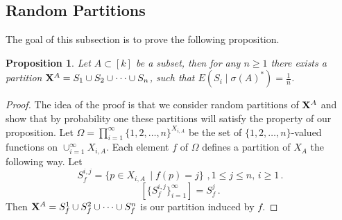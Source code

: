 \documentclass [11pt] {article}
\newtheorem{proposition}{Proposition}[section]
\def\xo{{\bf X}}
\begin{document}
\subsection{Random Partitions}\label{randpar}
The goal of this subsection is to prove
the following proposition.
\begin{proposition}
\label{random}
Let $A\subset [k]$ be a subset, then for any $n\geq 1$ there exists
a partition $\xo^A=S_1\cup S_2\cup\dots\cup S_n$, such that
$E(S_i\mid \sigma(A)^*)=\frac{1}{n}$.
\end{proposition}
\begin{proof}
The idea of the proof is that we consider random partitions of $\xo^A$ and show
that by probability one these partitions will satisfy the property of our
proposition.
Let $\Omega=\prod^\infty_{i=1}\{1,2,\dots,n\}^{X_{i,A}}$ be the
set of $\{1,2,\dots,n\}$-valued functions on $\cup^\infty_{i=1} X_{i,A}$.
Each element $f$ of $\Omega$ defines a partition of $X_A$ the following
way. Let
$$ S_f^{i,j}=\{p\in X_{i,A}\,\mid f(p)=j\}\,\,, 1\leq j \leq n,\, i\geq 1\,.$$
$$[\{S^{i,j}_f\}^\infty_{i=1}]= S^j_f\,.$$
Then $\xo^A=S^1_f\cup S^2_f\cup\dots \cup S^n_f$ is our
partition induced by $f$.


\end{proof}
\end{document}
